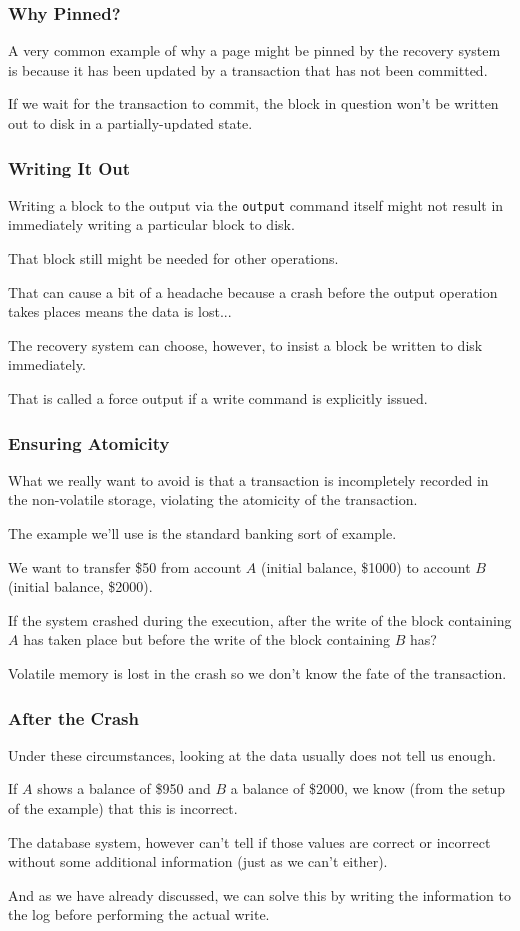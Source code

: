 \begin{frame}
\frametitle{Why Pinned?}

A very common example of why a page might be pinned by the recovery system is because it has been updated by a transaction that has not been committed.

If we wait for the transaction to commit, the block in question won't be written out to disk in a partially-updated state.

\end{frame}

\begin{frame}
\frametitle{Writing It Out}

Writing a block to the output via the \texttt{output} command itself might not result in immediately writing a particular block to disk. 

That block still might be needed for other operations. 

That can cause a bit of a headache because a crash before the output operation takes places means the data is lost... 

The recovery system can choose, however, to insist a block be written to disk immediately. 

That is called a \alert{force output} if a write command is explicitly issued.

\end{frame}

\begin{frame}
\frametitle{Ensuring Atomicity}

What we really want to avoid is that a transaction is incompletely recorded in the non-volatile storage, violating the atomicity of the transaction. 

The example we'll use is the standard banking sort of example. 

We want to transfer \$50 from account $A$ (initial balance, \$1000) to account $B$ (initial balance, \$2000). 

If the system crashed during the execution, after the write of the block containing $A$ has taken place but before the write of the block containing $B$ has? 

Volatile memory is lost in the crash so we don't know the fate of the transaction.

\end{frame}

\begin{frame}
\frametitle{After the Crash}

Under these circumstances, looking at the data usually does not tell us enough. 

If $A$ shows a balance of \$950 and $B$ a balance of \$2000, we know (from the setup of the example) that this is incorrect. 

The database system, however can't tell if those values are correct or incorrect without some additional information (just as we can't either). 

And as we have already discussed, we can solve this by writing the information to the log before performing the actual write.

\end{frame}

